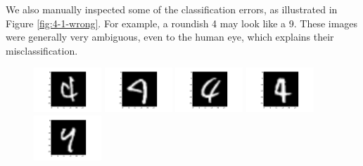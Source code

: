 \documentclass{article}
\begin{document}
\begin{multicols}{2}
We also manually inspected some of the classification errors, as illustrated 
in Figure \ref{fig:4-1-wrong}.
For example, a roundish 4 may look like a 9. These images were generally very ambiguous, even to the human eye,
which explains their misclassification.

\begin{figure}[t]
   \centering
   \includegraphics[width=1in]{img/4-1-wrong/4-1-wrong-11.pdf} \hspace{-.25in}
   \includegraphics[width=1in]{img/4-1-wrong/4-1-wrong-35.pdf} \hspace{-.25in}
   \includegraphics[width=1in]{img/4-1-wrong/4-1-wrong-68.pdf} \hspace{-.25in}
   \includegraphics[width=1in]{img/4-1-wrong/4-1-wrong-82.pdf} \hspace{-.25in}
   \includegraphics[width=1in]{img/4-1-wrong/4-1-wrong-138.pdf} \hspace{-.25in}
   

\end{figure}
\end{multicols}
\end{document}
